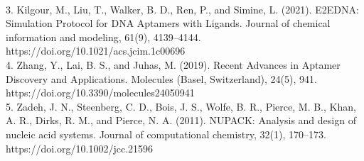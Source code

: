 \documentclass{article}
\begin{document}
\\
3.	Kilgour, M., Liu, T., Walker, B. D., Ren, P., and Simine, L. (2021). E2EDNA: Simulation Protocol for DNA Aptamers with Ligands. Journal of chemical information and modeling, 61(9), 4139–4144. https://doi.org/10.1021/acs.jcim.1c00696
\\
4.	Zhang, Y., Lai, B. S., and Juhas, M. (2019). Recent Advances in Aptamer Discovery and Applications. Molecules (Basel, Switzerland), 24(5), 941. https://doi.org/10.3390/molecules24050941 
\\
5.	Zadeh, J. N., Steenberg, C. D., Bois, J. S., Wolfe, B. R., Pierce, M. B., Khan, A. R., Dirks, R. M., and Pierce, N. A. (2011). NUPACK: Analysis and design of nucleic acid systems. Journal of computational chemistry, 32(1), 170–173. https://doi.org/10.1002/jcc.21596 



\end{document}
